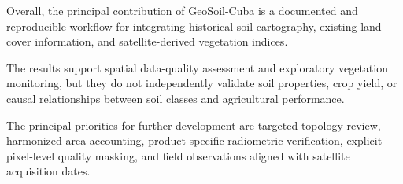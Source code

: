 Overall, the principal contribution
of GeoSoil-Cuba is a documented and
reproducible workflow for integrating
historical soil cartography, existing
land-cover information, and
satellite-derived vegetation indices.

The results support spatial
data-quality assessment and
exploratory vegetation monitoring,
but they do not independently
validate soil properties, crop
yield, or causal relationships
between soil classes and
agricultural performance.

The principal priorities for
further development are targeted
topology review, harmonized area
accounting, product-specific
radiometric verification,
explicit pixel-level quality
masking, and field observations
aligned with satellite
acquisition dates.